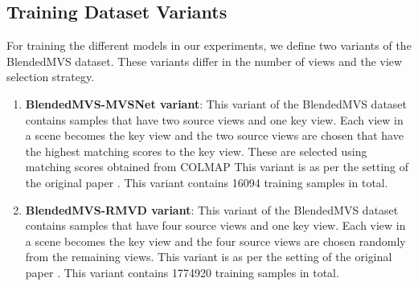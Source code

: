 \subsection{Training Dataset Variants}\label{subsec:train-data-var}
For training the different models in our experiments, we define two variants of the BlendedMVS dataset. These variants differ in the number of views and the view selection strategy. 
\begin{enumerate}
    \item \textbf{BlendedMVS-MVSNet variant}: This variant of the BlendedMVS dataset contains samples that have two source views and one key view. Each view in a scene becomes the key view and the two source views are chosen that have the highest matching scores to the key view. These are selected using matching scores obtained from COLMAP\cite{Schoenberger2016MVS} This variant is as per the setting of the original {\mvsn} paper \cite{Yao2018}. This variant contains 16094 training samples in total. 
    \item  \textbf{BlendedMVS-RMVD variant}: This variant of the BlendedMVS dataset contains samples that have four source views and one key view. Each view in a scene becomes the key view and the four source views are chosen randomly from the remaining views. This variant is as per the setting of the original {\rmvd} paper \cite{schroeppel2022benchmark}. This variant contains 1774920 training samples in total.
\end{enumerate}
